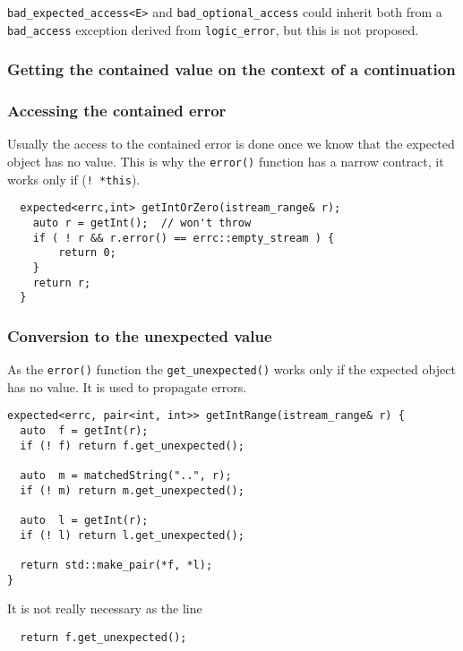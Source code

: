 \documentclass[a4paper,10pt]{article}
\newcommand{\cpp}[1]{\lstinline{#1}}
\begin{document}
\cpp{bad_expected_access<E>} and \cpp{bad_optional_access} could inherit both from a \cpp{bad_access} exception derived from \cpp{logic_error}, but this is not proposed.


\subsubsection{Getting the contained value on the context of a continuation}

\subsubsection{Accessing the contained error}

Usually the access to the contained error is done once we know that the expected object has no value. This is why the \cpp{error()} function has a narrow contract, it works only if (\cpp{! *this}).

\begin{lstlisting}
  expected<errc,int> getIntOrZero(istream_range& r);
    auto r = getInt();  // won't throw
    if ( ! r && r.error() == errc::empty_stream ) {
        return 0;
    }
    return r;
  }
\end{lstlisting}

\subsubsection{Conversion to the unexpected value}

As the \cpp{error()} function the \cpp{get_unexpected()} works only if the expected object has no value. It is used to propagate errors.

\begin{lstlisting}
expected<errc, pair<int, int>> getIntRange(istream_range& r) {
  auto  f = getInt(r);
  if (! f) return f.get_unexpected();

  auto  m = matchedString("..", r);
  if (! m) return m.get_unexpected();

  auto  l = getInt(r);
  if (! l) return l.get_unexpected();

  return std::make_pair(*f, *l);
}
\end{lstlisting}

It is not really necessary as the line 

\begin{lstlisting}
  return f.get_unexpected();
\end{lstlisting}
\end{document}
